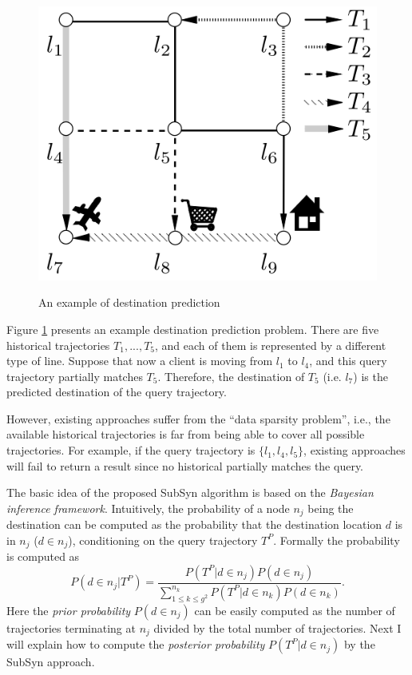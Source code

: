 \documentclass[paper=a4, fontsize=18pt]{article} %
\numberwithin{equation}{section} %
\numberwithin{figure}{section} %
\numberwithin{table}{section} %
\begin{document}
\begin{figure}[h]
  \centering
  \includegraphics[width=.6\linewidth]{7_25_dest_pred.png}\\
  \caption{An example of destination prediction}\label{fig:dest}
\end{figure}


Figure \ref{fig:dest} presents an example destination prediction problem. There are five historical trajectories $T_1, ..., T_5$, and each of them is represented by a different type of line. Suppose that now a client is moving from $l_1$ to $l_4$, and this query trajectory partially matches $T_5$. Therefore, the destination of $T_5$ (i.e. $l_7$) is the predicted destination of the query trajectory.

However, existing approaches suffer from the ``data sparsity problem'', i.e., the available historical trajectories is far from being able to cover all possible trajectories. For example, if the query trajectory is $\{l_1, l_4, l_5\}$, existing approaches will fail to return a result since no historical partially matches the query.

The basic idea of the proposed SubSyn algorithm is based on the \emph{Bayesian inference framework}. Intuitively, the probability of a node $n_j$ being the destination can be computed as the probability that the destination location $d$ is in $n_j$ ($d \in n_j$), conditioning on the query trajectory $T^P$. Formally the probability is computed as
$$P(d\in n_j | T^P) = \frac{P(T^P|d \in n_j)P(d\in n_j)}{\sum\limits^{n_k}_{1 \leq k \leq g^2} P(T^P|d\in n_k)P(d\in n_k)}.$$
Here the \emph{prior probability} $P(d \in n_j)$ can be easily computed as the number of trajectories  terminating at $n_j$ divided by the total number of trajectories. Next I will explain how to compute the \emph{posterior probability} $P(T^P | d \in n_j)$ by the SubSyn approach.
\end{document}
